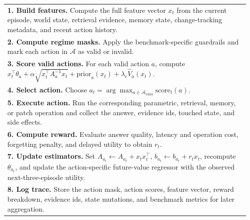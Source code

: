 \begin{tabular}{p{0.97\linewidth}}
\toprule
\textbf{1. Build features.} Compute the full feature vector $x_t$ from the current episode, world state, retrieval evidence, memory state, change-tracking metadata, and recent action history. \\
\textbf{2. Compute regime masks.} Apply the benchmark-specific guardrails and mark each action in $\mathcal{A}$ as valid or invalid. \\
\textbf{3. Score valid actions.} For each valid action $a$, compute $x_t^\top \theta_a + \alpha \sqrt{x_t^\top A_a^{-1} x_t} + \mathrm{prior}_a(x_t) + \lambda_e \hat V_a(x_t)$. \\
\textbf{4. Select action.} Choose $a_t = \arg\max_{a \in \mathcal{A}_{\mathrm{valid}}} \mathrm{score}_t(a)$. \\
\textbf{5. Execute action.} Run the corresponding parametric, retrieval, memory, or patch operation and collect the answer, evidence ids, touched state, and side effects. \\
\textbf{6. Compute reward.} Evaluate answer quality, latency and operation cost, forgetting penalty, and delayed utility to obtain $r_t$. \\
\textbf{7. Update estimators.} Set $A_{a_t} \leftarrow A_{a_t} + x_t x_t^\top$, $b_{a_t} \leftarrow b_{a_t} + r_t x_t$, recompute $\theta_{a_t}$, and update the action-specific future-value regressor with the observed next-three-episode utility. \\
\textbf{8. Log trace.} Store the action mask, action scores, feature vector, reward breakdown, evidence ids, state mutations, and benchmark metrics for later aggregation. \\
\bottomrule
\end{tabular}
